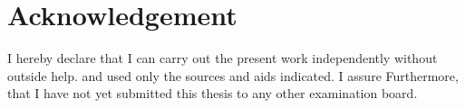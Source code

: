 
\chapter*{Acknowledgement}
I hereby declare that I can carry out the present work independently without outside help.
and used only the sources and aids indicated. I assure
Furthermore, that I have not yet submitted this thesis to any other examination board.



\vspace{5em}